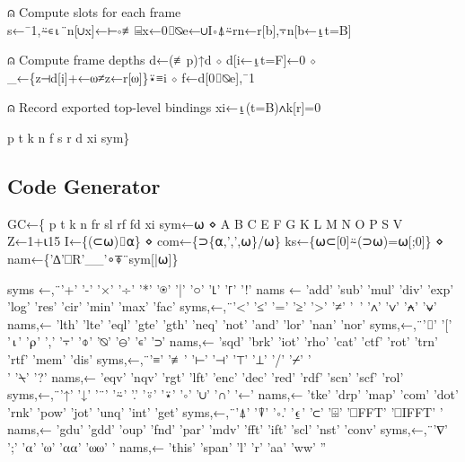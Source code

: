 \documentclass{article}%
\begin{document}
⍝ Compute slots for each frame
         s←¯1,⍨∊⍳¨n[∪x]←⊢∘≢⌸x←0⌷⍉e←∪I∘⍋⍨rn←r[b],⍪n[b←⍸t=B]

⍝ Compute frame depths
         d←(≢p)↑d ⋄ d[i←⍸t=F]←0 ⋄ _←\{z⊣d[i]+←⍵≠z←r[⍵]\}⍣≡i ⋄ f←d[0⌷⍉e],¯1

⍝ Record exported top-level bindings
         xi←⍸(t=B)∧k[r]=0

         p t k n f s r d xi sym\}
\nwendcode{}\nwdocspar

\subsection{Code Generator}

\nwenddocs{}\endmoddef\nwstartdeflinemarkup{}\nwenddeflinemarkup
GC←\{
        p t k n fr sl rf fd xi sym←⍵ ⋄ A B C E F G K L M N O P S V Z←1+⍳15
        I←\{(⊂⍵)⌷⍺\} ⋄ com←\{⊃\{⍺,',',⍵\}/⍵\}
        ks←\{⍵⊂[0]⍨(⊃⍵)=⍵[;0]\} ⋄ nam←\{'∆'⎕R'__'∘⍕¨sym[|⍵]\}

        syms ←,¨'+'           '-'            '×'            '÷'            '*'             '⍟'           '|'              '○'           '⌊'          '⌈'           '!'
        nams ←        'add'    'sub'  'mul' 'div' 'exp' 'log' 'res'    'cir'   'min'  'max' 'fac'
        syms,←,¨'<'           '≤'          '='             '≥'           '>'             '≠'           '~'              '∧'           '∨'          '⍲'           '⍱'
        nams,←        'lth'    'lte'  'eql' 'gte' 'gth' 'neq' 'not'    'and'   'lor'  'nan' 'nor'
        syms,←,¨'⌷'                 '['            '⍳'           '⍴'           ','             '⍪'           '⌽'            '⍉'           '⊖'          '∊'           '⊃'
        nams,←        'sqd'    'brk'  'iot' 'rho' 'cat' 'ctf' 'rot'    'trn'   'rtf'  'mem' 'dis'
        syms,←,¨'≡'                 '≢'          '⊢'           '⊣'           '⊤'           '⊥'           '/'              '⌿'           '\\'            '⍀'           '?'
        nams,←        'eqv'    'nqv'  'rgt' 'lft' 'enc' 'dec' 'red'    'rdf'   'scn'  'scf' 'rol'
        syms,←,¨'↑'                 '↓'          '¨'            '⍨'           '.'             '⍤'           '⍣'            '∘'           '∪'          '∩'           '←'
        nams,←        'tke'    'drp'  'map' 'com' 'dot' 'rnk' 'pow'    'jot'   'unq'  'int' 'get'
        syms,←,¨'⍋'                 '⍒'          '∘.'  '⍷'           '⊂'           '⌹'           '⎕FFT' '⎕IFFT' '%
        nams,←        'gdu'    'gdd'  'oup' 'fnd' 'par' 'mdv' 'fft'    'ift'   'scl'  'nst' 'conv'
        syms,←,¨'∇'                 ';'            '⍺'           '⍵'           '⍺⍺'        '⍵⍵'        '%
        nams,←        'this' 'span' 'l'               'r'             'aa'    'ww'    ''
\end{document}
